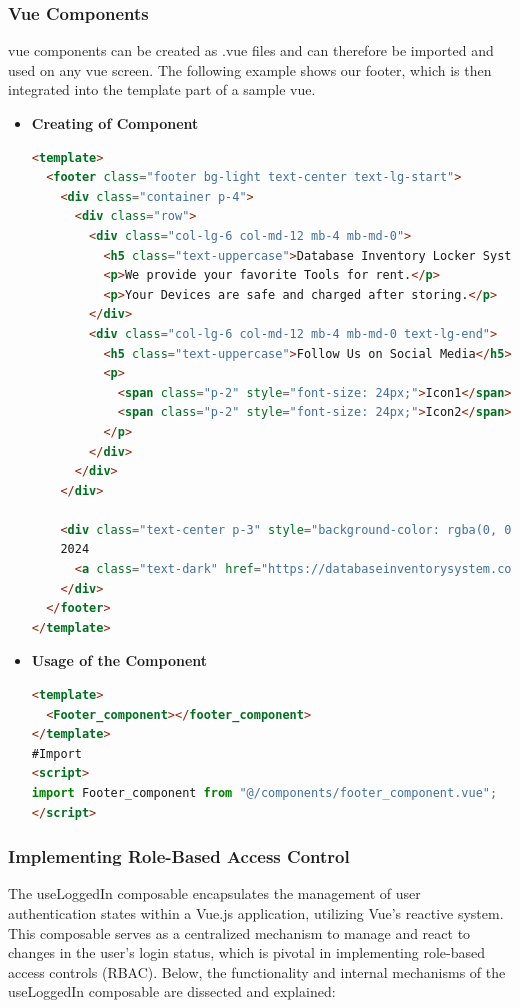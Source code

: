 \subsubsection{Vue Components}
vue components can be created as .vue files and can therefore be imported and used on any vue screen. The following example shows our footer, which is then integrated into the template part of a sample vue.
\begin{itemize}
  \item \textbf{Creating of Component}

\begin{lstlisting}[language=HTML]
<template>
  <footer class="footer bg-light text-center text-lg-start">
    <div class="container p-4">
      <div class="row">
        <div class="col-lg-6 col-md-12 mb-4 mb-md-0">
          <h5 class="text-uppercase">Database Inventory Locker System</h5>
          <p>We provide your favorite Tools for rent.</p>
          <p>Your Devices are safe and charged after storing.</p>
        </div>
        <div class="col-lg-6 col-md-12 mb-4 mb-md-0 text-lg-end">
          <h5 class="text-uppercase">Follow Us on Social Media</h5>
          <p>
            <span class="p-2" style="font-size: 24px;">Icon1</span>
            <span class="p-2" style="font-size: 24px;">Icon2</span>
          </p>
        </div>
      </div>
    </div>

    <div class="text-center p-3" style="background-color: rgba(0, 0, 0, 0.05);">
    2024
      <a class="text-dark" href="https://databaseinventorysystem.com/">databaseinventory.com</a>
    </div>
  </footer>
</template>

    \end{lstlisting}
\item \textbf{Usage of the Component}
    \begin{lstlisting}[language=HTML]
<template>
  <Footer_component></footer_component>
</template>
#Import 
<script>
import Footer_component from "@/components/footer_component.vue";
</script>
    \end{lstlisting}
\end{itemize}
\subsubsection{Implementing Role-Based Access Control}
The useLoggedIn composable encapsulates the management of user authentication states within a Vue.js application, utilizing Vue's reactive system. This composable serves as a centralized mechanism to manage and react to changes in the user's login status, which is pivotal in implementing role-based access controls (RBAC). Below, the functionality and internal mechanisms of the useLoggedIn composable are dissected and explained:

